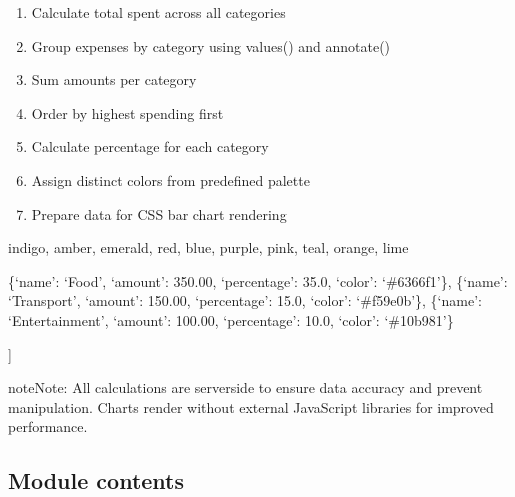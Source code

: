 \documentclass[letterpaper,10pt,english]{sphinxmanual}
\begin{document}
\begin{fulllineitems}
\begin{description}
\begin{enumerate}
\item {} 
\sphinxAtStartPar
Calculate total spent across all categories

\item {} 
\sphinxAtStartPar
Group expenses by category using values() and annotate()

\item {} 
\sphinxAtStartPar
Sum amounts per category

\item {} 
\sphinxAtStartPar
Order by highest spending first

\item {} 
\sphinxAtStartPar
Calculate percentage for each category

\item {} 
\sphinxAtStartPar
Assign distinct colors from predefined palette

\item {} 
\sphinxAtStartPar
Prepare data for CSS bar chart rendering

\end{enumerate}

\sphinxAtStartPar
indigo, amber, emerald, red, blue, purple, pink, teal, orange, lime

\begin{description}
\sphinxlineitem{category\_rows = {[}}
\sphinxAtStartPar
\{‘name’: ‘Food’, ‘amount’: 350.00, ‘percentage’: 35.0, ‘color’: ‘\#6366f1’\},
\{‘name’: ‘Transport’, ‘amount’: 150.00, ‘percentage’: 15.0, ‘color’: ‘\#f59e0b’\},
\{‘name’: ‘Entertainment’, ‘amount’: 100.00, ‘percentage’: 10.0, ‘color’: ‘\#10b981’\}

\end{description}

\sphinxAtStartPar
{]}

\end{description}

\begin{sphinxadmonition}{note}{Note:}
\sphinxAtStartPar
All calculations are server\sphinxhyphen{}side to ensure data accuracy
and prevent manipulation. Charts render without external
JavaScript libraries for improved performance.
\end{sphinxadmonition}

\end{fulllineitems}



\subsection{Module contents}
\label{\detokenize{expensesApp:module-expensesApp}}\label{\detokenize{expensesApp:module-contents}}
\sphinxstepscope
\end{document}
